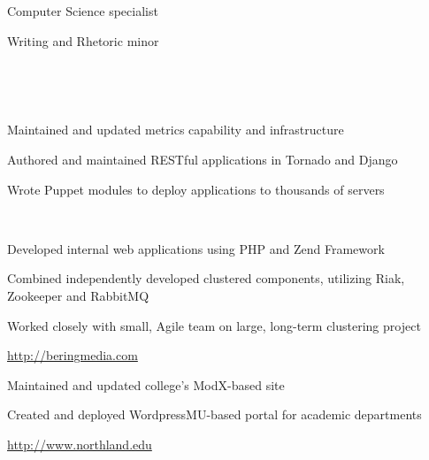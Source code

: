 \documentclass[letterpaper,11pt,notitlepage]{article}
\begin{document}

\vbar
{}
    \begin{employment}
        \item Computer Science specialist
        \item Writing and Rhetoric minor
    \end{employment}
    \\

\vbar
{}
         \\
        \begin{employment}
            \item Maintained and updated metrics capability and infrastructure
            \item Authored and maintained RESTful applications in Tornado and Django
            \item Wrote Puppet modules to deploy applications to thousands of servers
        \end{employment}
         \\
        \begin{employment}
            \item Developed internal web applications using PHP and Zend 
            Framework
            \item Combined independently developed clustered components, 
            utilizing Riak, Zookeeper and RabbitMQ 
            \item Worked closely with small, Agile team on large, long-term 
            clustering project 
            \item \url{http://beringmedia.com}
        \end{employment}
        \begin{employment}
            \item Maintained and updated college's ModX-based site
            \item Created and deployed WordpressMU-based portal for academic
            departments 
            \item \url{http://www.northland.edu}
        \end{employment}
\end{document}
